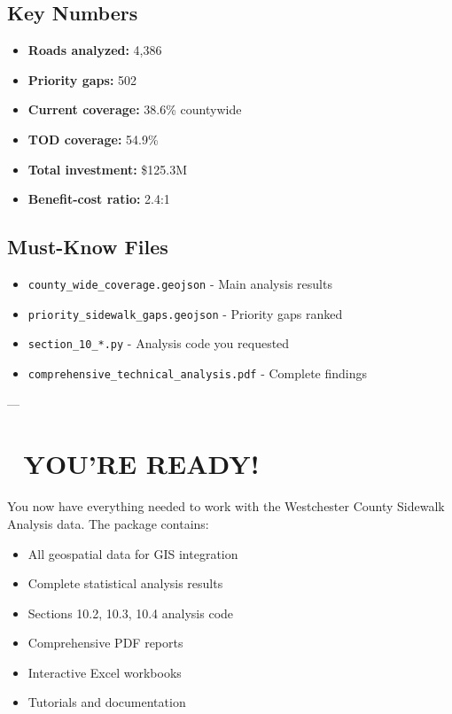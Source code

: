 \documentclass[11pt,letterpaper]{article}
\begin{document}
\subsection{Key Numbers}
\begin{itemize}
    \item \textbf{Roads analyzed:} 4,386
    \item \textbf{Priority gaps:} 502
    \item \textbf{Current coverage:} 38.6\% countywide
    \item \textbf{TOD coverage:} 54.9\%
    \item \textbf{Total investment:} \$125.3M
    \item \textbf{Benefit-cost ratio:} 2.4:1
\end{itemize}

\subsection{Must-Know Files}
\begin{itemize}
    \item \texttt{county\_wide\_coverage.geojson} - Main analysis results
    \item \texttt{priority\_sidewalk\_gaps.geojson} - Priority gaps ranked
    \item \texttt{section\_10\_*.py} - Analysis code you requested
    \item \texttt{comprehensive\_technical\_analysis.pdf} - Complete findings
\end{itemize}

---

\section{🎉 YOU'RE READY!}

You now have everything needed to work with the Westchester County Sidewalk Analysis data. The package contains:

\begin{itemize}
    \item \textcolor{success}{\checkmark} All geospatial data for GIS integration
    \item \textcolor{success}{\checkmark} Complete statistical analysis results
    \item \textcolor{success}{\checkmark} Sections 10.2, 10.3, 10.4 analysis code
    \item \textcolor{success}{\checkmark} Comprehensive PDF reports
    \item \textcolor{success}{\checkmark} Interactive Excel workbooks
    \item \textcolor{success}{\checkmark} Tutorials and documentation
\end{itemize}
\end{document}
